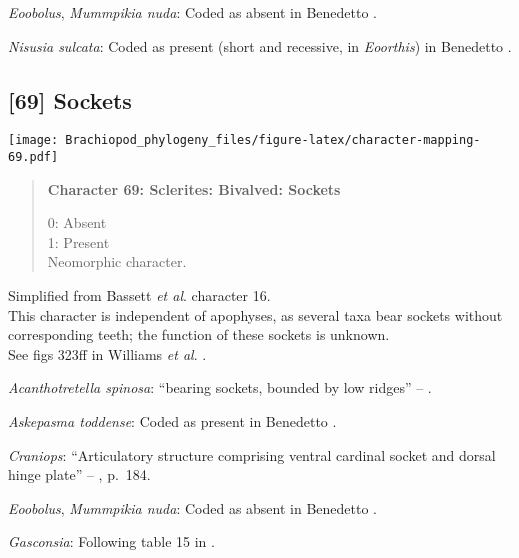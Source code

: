 \documentclass[openany]{book}
\theoremstyle{definition}
\theoremstyle{definition}
\theoremstyle{definition}
\theoremstyle{remark}
\begin{document}
\hypertarget{Eoobolus-coding-68}{}
\emph{Eoobolus}, \emph{Mummpikia nuda}: Coded as absent in Benedetto
\citeyearpar{Benedetto2009iChaniella}.

\hypertarget{Nisusia_sulcata-coding-68}{}
\emph{Nisusia sulcata}: Coded as present (short and recessive, in
\emph{Eoorthis}) in Benedetto \citeyearpar{Benedetto2009iChaniella}.

\subsection*{{[}69{]} Sockets}\label{sockets}

\texttt{[image: Brachiopod\_phylogeny\_files/figure-latex/character-mapping-69.pdf]}

\begin{quote}
\textbf{Character 69: Sclerites: Bivalved: Sockets}

0: Absent\\
1: Present\\
Neomorphic character.
\end{quote}

Simplified from Bassett \emph{et al}.
\citeyearpar{Bassett2001Functionalmorphology} character 16.\\
This character is independent of apophyses, as several taxa bear sockets
without corresponding teeth; the function of these sockets is unknown.\\
See figs 323ff in Williams \emph{et al}.
\citeyearpar{Williams1997Introduction}.

\hypertarget{Acanthotretella_spinosa-coding-69}{}
\emph{Acanthotretella spinosa}: ``bearing sockets, bounded by low
ridges'' -- \citet{Williams2000LinguliformeaCraniiformea}.

\hypertarget{Askepasma_toddense-coding-69}{}
\emph{Askepasma toddense}: Coded as present in Benedetto
\citeyearpar{Benedetto2009iChaniella}.

\hypertarget{Craniops-coding-69}{}
\emph{Craniops}: ``Articulatory structure comprising ventral cardinal
socket and dorsal hinge plate'' --
\citet{Williams2000LinguliformeaCraniiformea}, p.~184.

\hypertarget{Eoobolus-coding-69}{}
\emph{Eoobolus}, \emph{Mummpikia nuda}: Coded as absent in Benedetto
\citeyearpar{Benedetto2009iChaniella}.

\hypertarget{Gasconsia-coding-69}{}
\emph{Gasconsia}: Following table 15 in
\citet{Williams2000LinguliformeaCraniiformea}.
\end{document}
